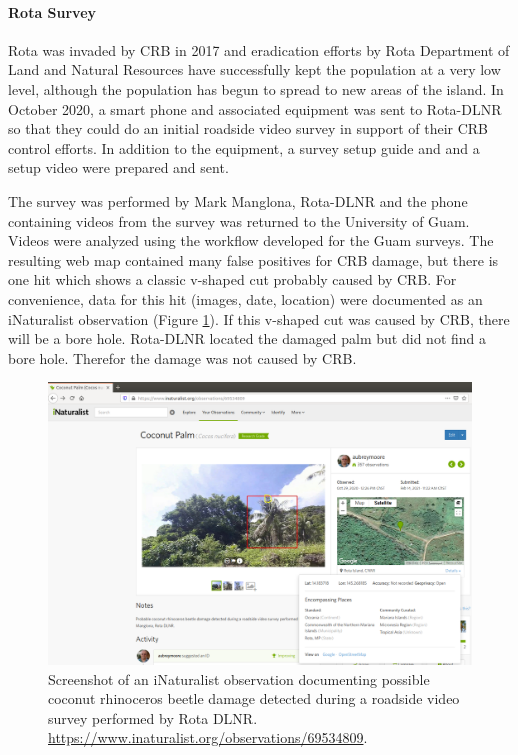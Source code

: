 \documentclass[12pt,letterpaper,english,bibliography=totocnumbered,abstract=on]{scrartcl}
\begin{document}
\clearpage
\paragraph{Rota Survey}

Rota was invaded by CRB in 2017 and eradication efforts by Rota Department of Land and Natural Resources have successfully kept the population at a very low level, although the population has begun to spread to new areas of the island. In October 2020, a smart phone and associated equipment was sent to Rota-DLNR so that they could do an initial roadside video survey in support of their CRB control efforts. In addition to the equipment, a survey setup guide and  \cite{mooreSetAutomatedRoadside2020} and a setup video \cite{mooreYouTubeVideoMounting2020} were prepared and sent.

The survey was performed by Mark Manglona, Rota-DLNR and the phone containing videos from the survey was returned to the University of Guam.  Videos were analyzed using the workflow developed for the Guam surveys. The resulting web map contained many false positives for CRB damage, but there is one hit which shows a classic v-shaped cut probably caused by CRB. For convenience, data for this hit (images, date, location) were documented as an iNaturalist observation (Figure \ref{fig:rota-inat-obs}). If this v-shaped cut was caused by CRB, there will be a bore hole. Rota-DLNR located the damaged palm but did not find a bore hole.  Therefor the damage was not caused by CRB.

\begin{figure}[h]
	\centering
	\includegraphics[width=1\linewidth]{images/Rota-iNat-obs}
	\caption{Screenshot of an iNaturalist observation documenting possible coconut rhinoceros beetle damage detected during a roadside video survey performed by Rota DLNR. \url{https://www.inaturalist.org/observations/69534809}.}
	\label{fig:rota-inat-obs}
\end{figure}
\end{document}
